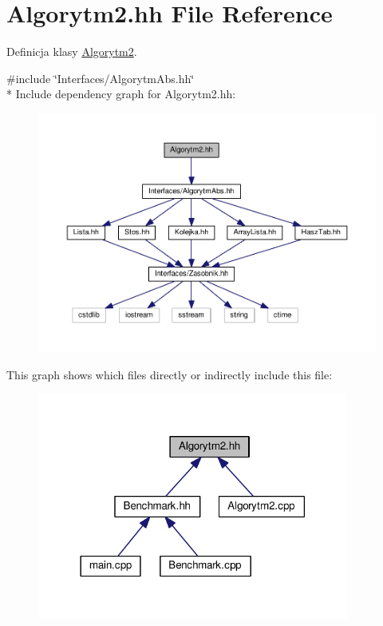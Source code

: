 \hypertarget{a00021}{}\section{Algorytm2.\+hh File Reference}
\label{a00021}


Definicja klasy \hyperlink{a00003}{Algorytm2}.  


{\ttfamily \#include \char`\"{}Interfaces/\+Algorytm\+Abs.\+hh\char`\"{}}\\*
Include dependency graph for Algorytm2.\+hh\+:
\nopagebreak
\begin{figure}[H]
\begin{center}
\leavevmode
\includegraphics[width=350pt]{a00057}
\end{center}
\end{figure}
This graph shows which files directly or indirectly include this file\+:
\nopagebreak
\begin{figure}[H]
\begin{center}
\leavevmode
\includegraphics[width=290pt]{a00058}
\end{center}
\end{figure}
